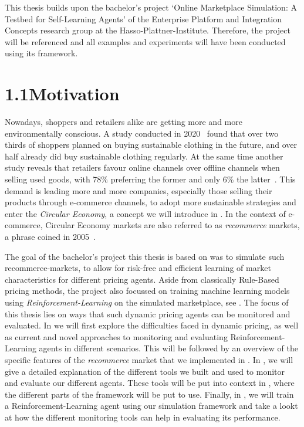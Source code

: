 \begin{jointwork}
	This thesis builds upon the bachelor's project `Online Marketplace Simulation: A Testbed for Self-Learning Agents' of the Enterprise Platform and Integration Concepts research group at the Hasso-Plattner-Institute. Therefore, the project will be referenced and all examples and experiments will have been conducted using its framework.
\end{jointwork}

\section*{1.1\space\space Motivation}

Nowadays, shoppers and retailers alike are getting more and more environmentally conscious. A study conducted in 2020~\cite{StatistaSustainableClothing} found that over two thirds of shoppers planned on buying sustainable clothing in the future, and over half already did buy sustainable clothing regularly. At the same time another study reveals that retailers favour online channels over offline channels when selling used goods, with 78\% preferring the former and only 6\% the latter~\cite{StatistaUsedRetailers}. This demand is leading more and more companies, especially those selling their products through e-commerce channels, to adopt more sustainable strategies and enter the \emph{Circular Economy}, a concept we will introduce in . In the context of e-commerce, Circular Economy markets are also referred to as \emph{recommerce} markets, a phrase coined in 2005~\cite{RecommerceDefinition}.

The goal of the bachelor's project this thesis is based on was to simulate such recommerce-markets, to allow for risk-free and efficient learning of market characteristics for different pricing agents. Aside from classically Rule-Based pricing methods, the project also focussed on training machine learning models using \emph{Reinforcement-Learning} on the simulated marketplace, see . The focus of this thesis lies on ways that such dynamic pricing agents can be monitored and evaluated. In  we will first explore the difficulties faced in dynamic pricing, as well as current and novel approaches to monitoring and evaluating Reinforcement-Learning agents in different scenarios. This will be followed by an overview of the specific features of the \emph{recommerce} market that we implemented in . In , we will give a detailed explanation of the different tools we built and used to monitor and evaluate our different agents. These tools will be put into context in , where the different parts of the framework will be put to use. Finally, in , we will train a Reinforcement-Learning agent using our simulation framework and take a lookt at how the different monitoring tools can help in evaluating its performance.

